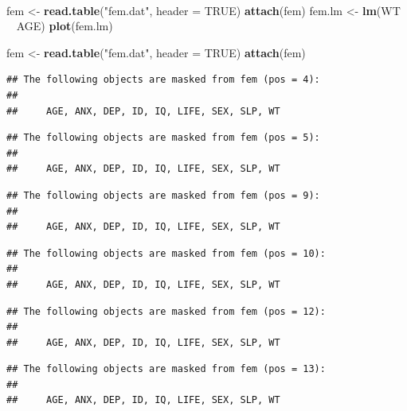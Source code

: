 \documentclass[12pt,a4paper]{book}
\newenvironment{Shaded}{\begin{snugshade}}{\end{snugshade}}
\newcommand{\DataTypeTok}[1]{\textcolor[rgb]{0.13,0.29,0.53}{#1}}
\newcommand{\KeywordTok}[1]{\textcolor[rgb]{0.13,0.29,0.53}{\textbf{#1}}}
\newcommand{\NormalTok}[1]{#1}
\newcommand{\OperatorTok}[1]{\textcolor[rgb]{0.81,0.36,0.00}{\textbf{#1}}}
\newcommand{\OtherTok}[1]{\textcolor[rgb]{0.56,0.35,0.01}{#1}}
\newcommand{\StringTok}[1]{\textcolor[rgb]{0.31,0.60,0.02}{#1}}
\theoremstyle{definition}
\theoremstyle{definition}
\theoremstyle{definition}
\theoremstyle{remark}
\begin{document}
~

\begin{Shaded}
\begin{Highlighting}[]
\NormalTok{fem <-}\StringTok{ }\KeywordTok{read.table}\NormalTok{(}\StringTok{"fem.dat"}\NormalTok{, }\DataTypeTok{header =} \OtherTok{TRUE}\NormalTok{)}
\KeywordTok{attach}\NormalTok{(fem)}
\NormalTok{fem.lm <-}\StringTok{ }\KeywordTok{lm}\NormalTok{(WT }\OperatorTok{~}\StringTok{ }\NormalTok{AGE)}
\KeywordTok{plot}\NormalTok{(fem.lm)}
\end{Highlighting}
\end{Shaded}

\begin{Shaded}
\begin{Highlighting}[]
\NormalTok{fem <-}\StringTok{ }\KeywordTok{read.table}\NormalTok{(}\StringTok{"fem.dat"}\NormalTok{, }\DataTypeTok{header =} \OtherTok{TRUE}\NormalTok{)}
\KeywordTok{attach}\NormalTok{(fem)}
\end{Highlighting}
\end{Shaded}

\begin{verbatim}
## The following objects are masked from fem (pos = 4):
## 
##     AGE, ANX, DEP, ID, IQ, LIFE, SEX, SLP, WT
\end{verbatim}

\begin{verbatim}
## The following objects are masked from fem (pos = 5):
## 
##     AGE, ANX, DEP, ID, IQ, LIFE, SEX, SLP, WT
\end{verbatim}

\begin{verbatim}
## The following objects are masked from fem (pos = 9):
## 
##     AGE, ANX, DEP, ID, IQ, LIFE, SEX, SLP, WT
\end{verbatim}

\begin{verbatim}
## The following objects are masked from fem (pos = 10):
## 
##     AGE, ANX, DEP, ID, IQ, LIFE, SEX, SLP, WT
\end{verbatim}

\begin{verbatim}
## The following objects are masked from fem (pos = 12):
## 
##     AGE, ANX, DEP, ID, IQ, LIFE, SEX, SLP, WT
\end{verbatim}

\begin{verbatim}
## The following objects are masked from fem (pos = 13):
## 
##     AGE, ANX, DEP, ID, IQ, LIFE, SEX, SLP, WT
\end{verbatim}
\end{document}
